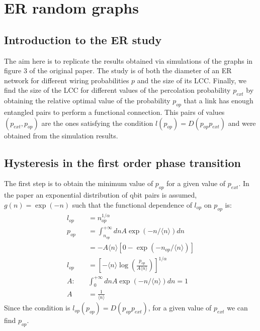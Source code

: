 \chapter{ER random graphs}


\section{Introduction to the ER study}
The aim here is to replicate the results obtained via simulations of the graphs in figure 3 of the original paper. The study is of both the diameter of an ER network for different wiring probabilities $p$ and the size of its LCC. Finally, we find the size of the LCC for different values of the percolation probability $p_{ext}$ by obtaining the relative optimal value of the probability $p_{op}$ that a link has enough entangled pairs to perform a functional connection. This pairs of values $(p_{ext}, p_{op})$ are the ones satisfying the condition $l(p_{op}) = D(p_{op}p_{ext})$ and were obtained from the simulation results.

\section{Hysteresis in the first order phase transition}
The first step is to obtain the minimum value of $p_{op}$ for a given value of $p_{ext}$. In the paper an exponential distribution of qbit pairs is assumed, $g(n) = \exp\left( -n \right)$ such that the functional dependence of $l_{op}$ on $p_{op}$ is:
\begin{align}
    l_{op} &= n_{op}^{1/\alpha} \\
    p_{op} &= \int_{n_{op}}^{+\infty} dn A\exp\left(-n/\langle n\rangle\right)dn  \\
    &= -A\langle n \rangle \left[0 - \exp\left(-n_{op}/\langle n\rangle\right)\right] \\
    l_{op}&= \left[-\langle n\rangle\log\left(\frac{p_{op}}{A\langle n \rangle}\right)\right]^{1/\alpha}  \\
    A:\quad & \int_{0}^{+\infty} dn A\exp\left(-n/\langle n\rangle\right)dn = 1 \\
    A &= \frac{1}{\langle n \rangle}
\end{align}
Since the condition is $l_{op}(p_{op}) = D(p_{op}p_{ext})$, for a given value of $p_{ext}$ we can find $p_{op}$.

